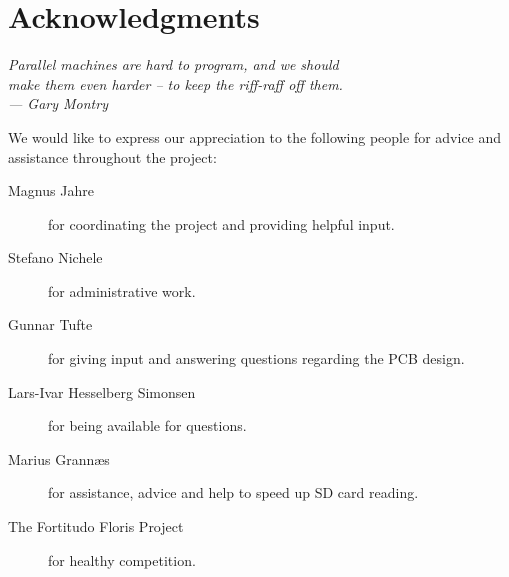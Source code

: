 
\bigskip

\begingroup
\let\clearpage\relax
\let\cleardoublepage\relax
\let\cleardoublepage\relax
\chapter*{Acknowledgments}
\begin{flushright}{\slshape
    Parallel machines are hard to program, and we should\\
    make them even harder -- to keep the riff-raff off them.\\ \medskip
    ---  Gary Montry}  %
\end{flushright}
\bigskip

We would like to express our appreciation to the following people for
advice and assistance throughout the project:

\begin{description} %
\item[Magnus Jahre] for coordinating the project and providing helpful input.
\item[Stefano Nichele] for administrative work. 
\item[Gunnar Tufte] for giving input and answering questions regarding the PCB
design.
\item[Lars-Ivar Hesselberg Simonsen] for being available for questions.
\item[Marius Grann{\ae}s] for assistance, advice and help to speed up SD
card reading.
\item[The Fortitudo Floris Project] for healthy competition.
\end{description}
\endgroup

